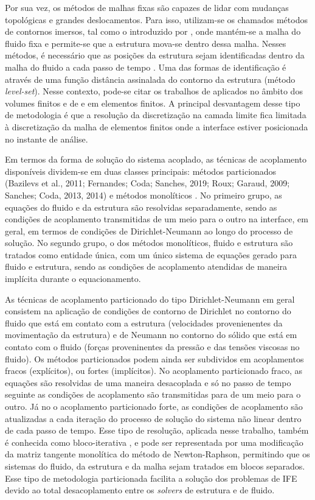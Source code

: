 Por sua vez, os métodos de malhas fixas são capazes de lidar com mudanças topológicas e grandes deslocamentos. Para isso, utilizam-se os chamados métodos de contornos imersos, tal como o introduzido por , onde mantém-se a malha do fluido fixa e permite-se que a estrutura mova-se dentro dessa malha. Nesses métodos, é necessário que as posições da estrutura sejam identificadas dentro da malha do fluido a cada passo de tempo \cite{MittalI:2005,WangRGF:2011}. Uma das formas de identificação é através de uma função distância assinalada do contorno da estrutura (método \textit{level-set}). Nesse contexto, pode-se citar os trabalhos de   aplicados no âmbito dos volumes finitos e de  e  em elementos finitos. A principal desvantagem desse tipo de metodologia é que a resolução da discretização na camada limite fica limitada à discretização da malha de elementos finitos onde a interface estiver posicionada no instante de análise.

Em termos da forma de solução do sistema acoplado, as técnicas de acoplamento disponíveis dividem-se em duas classes principais: métodos particionados (Bazilevs et al.,
2011; Fernandes; Coda; Sanches, 2019; Roux; Garaud, 2009; Sanches; Coda, 2013, 2014) e métodos monolíticos \cite{Avancini:2023,Blom:1998,Hubneretal:2004,HronM:2007}. No primeiro grupo, as equações do fluido e da estrutura são resolvidas separadamente, sendo as condições de acoplamento transmitidas de um meio para o outro na interface, em geral, em termos de condições de Dirichlet-Neumann ao longo do processo de solução. No segundo grupo, o dos métodos monolíticos, fluido e estrutura são tratados como entidade única, com um único sistema de equações gerado para fluido e estrutura, sendo as condições de acoplamento atendidas de maneira implícita durante o equacionamento.

As técnicas de acoplamento particionado do tipo Dirichlet-Neumann em geral consistem na aplicação de condições de contorno de Dirichlet no contorno do fluido que está em contato com a estrutura (velocidades provenienentes da movimentação da estrutura) e de Neumann no contorno do sólido que está em contato com o fluido (forças proveninentes da pressão e das tensões viscosas no fluido). Os métodos particionados podem ainda ser subdividos em acoplamentos fracos (explícitos), ou fortes (implícitos). No acoplamento particionado fraco, as equações são resolvidas de uma maneira desacoplada e só no passo de tempo seguinte as condições de acoplamento são transmitidas para de um meio para o outro. Já no o acoplamento particionado forte, as condições de acoplamento são atualizadas a cada iteração do processo de solução do sistema não linear dentro de cada passo de tempo. Esse tipo de resolução, aplicada nesse trabalho, também é conhecida como bloco-iterativa \cite{BazilevsTT:2013a}, e pode ser representada por uma  modificação da matriz tangente monolítica do método de Newton-Raphson, permitindo que os sistemas do fluido, da estrutura e da malha sejam tratados em blocos separados. Esse tipo de metodologia particionada facilita a solução dos problemas de IFE devido ao total desacoplamento entre os \textit{solvers} de estrutura e de fluido.


